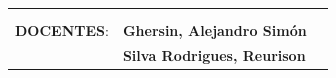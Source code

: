 \begin{titlepage}
\begin{figure}[H]
\begin{adjustwidth}{-1cm}{}
\begin{tabular}{llr}
 &  & \\
 &  & \\
	\textbf{DOCENTES}:
	& \textbf{Ghersin, Alejandro Sim\'on} & \\
	& \textbf{Silva Rodrigues, Reurison} & \\
\end{tabular}
\end{adjustwidth}
\end{figure}

\vspace*{1.5cm}
\vspace*{0.5cm}


\end{titlepage}
